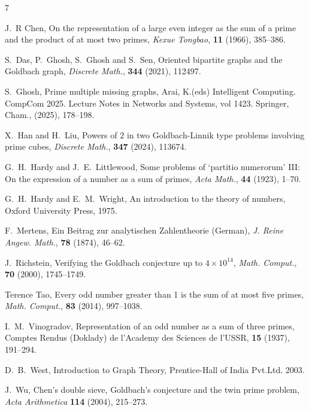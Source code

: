 \documentclass[11pt]{article}
\theoremstyle{definition}
\theoremstyle{remark}
\numberwithin{equation}{section}
\begin{document}
\begin{thebibliography}{7}


J.~R Chen, On the representation of a large even integer as the sum of a prime and the product of at most two primes, \emph{Kexue Tongbao}, \textbf{11} (1966), 385--386.

S.~Das, P.~Ghosh, S.~Ghosh and S.~Sen, Oriented bipartite graphs and the Goldbach graph, \emph{Discrete Math.}, \textbf{344} (2021), 112497.

S.~Ghosh, Prime multiple missing graphs, Arai, K.(eds) Intelligent Computing. CompCom 2025. Lecture Notes in Networks and Systems, vol 1423. Springer, Cham., (2025), 178--198. 

X.~Han and H.~Liu, Powers of $2$ in two Goldbach-Linnik type problems involving prime cubes, \emph{Discrete Math.}, \textbf{347} (2024), 113674.

G.~H.~Hardy and J.~E.~Littlewood, Some problems of `partitio numerorum' III: On the expression of a number as a sum of primes, \emph{Acta Math.}, \textbf{44} (1923), 1--70.

G.~H.~Hardy and E.~M.~Wright, An introduction to the theory of numbers, Oxford University Press, 1975.

F.~Mertens, Ein Beitrag zur analytischen Zahlentheorie (German), \emph{J. Reine Angew. Math.}, \textbf{78} (1874), 46--62.

J.~Richstein, Verifying the Goldbach conjecture up to $4 \times 10^{14}$, \emph{Math. Comput.}, \textbf{70} (2000), 1745--1749.

Terence Tao, Every odd number greater than 1 is the sum of at most five primes, \emph{Math. Comput.}, \textbf{83} (2014), 997--1038.

I.~M.~Vinogradov, Representation of an odd number as a sum of three primes, Comptes Rendus (Doklady) de l'Academy des Sciences de l'USSR, \textbf{15} (1937), 191--294.

D.~B.~West, Introduction to Graph Theory, Prentice-Hall of India Pvt.Ltd. 2003.

J.~Wu, Chen's double sieve, Goldbach's conjecture and the twin prime problem, \emph{Acta Arithmetica} \textbf{114} (2004), 215--273.


\end{thebibliography} 


\newpage
\end{document}
